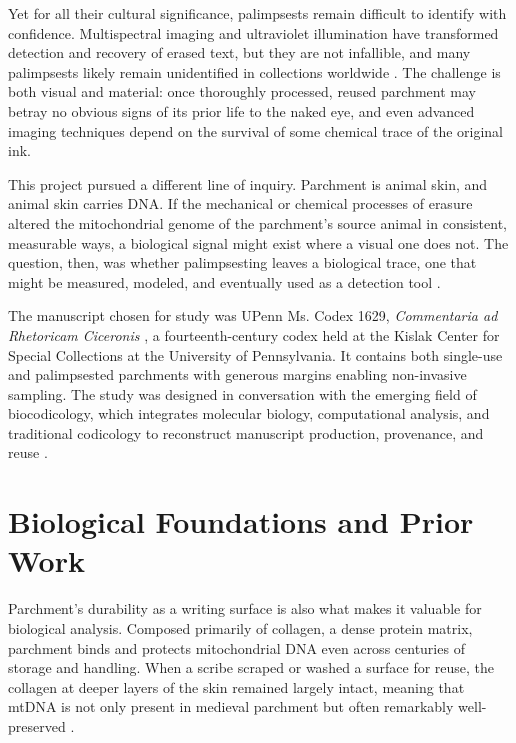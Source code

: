 \documentclass[final]{anthology-ch} %
\begin{document}
Yet for all their cultural significance, palimpsests remain difficult to identify with confidence. Multispectral imaging and ultraviolet illumination have transformed detection and recovery of erased text, but they are not infallible, and many palimpsests likely remain unidentified in collections worldwide \cite{easton2003multispectral}. The challenge is both visual and material: once thoroughly processed, reused parchment may betray no obvious signs of its prior life to the naked eye, and even advanced imaging techniques depend on the survival of some chemical trace of the original ink.

This project pursued a different line of inquiry. Parchment is animal skin, and animal skin carries DNA. If the mechanical or chemical processes of erasure altered the mitochondrial genome of the parchment's source animal in consistent, measurable ways, a biological signal might exist where a visual one does not. The question, then, was whether palimpsesting leaves a biological trace, one that might be measured, modeled, and eventually used as a detection tool \cite{harr2025manuscripts}.

The manuscript chosen for study was UPenn Ms. Codex 1629, \textit{Commentaria ad Rhetoricam Ciceronis} \cite{cicero1342commentaria}, a fourteenth-century codex held at the Kislak Center for Special Collections at the University of Pennsylvania. It contains both single-use and palimpsested parchments with generous margins enabling non-invasive sampling. The study was designed in conversation with the emerging field of biocodicology, which integrates molecular biology, computational analysis, and traditional codicology to reconstruct manuscript production, provenance, and reuse \cite{fiddyment2015animal, teasdale2017york}.

\section{Biological Foundations and Prior Work} \label{sec:prior}

Parchment's durability as a writing surface is also what makes it valuable for biological analysis. Composed primarily of collagen, a dense protein matrix, parchment binds and protects mitochondrial DNA even across centuries of storage and handling. When a scribe scraped or washed a surface for reuse, the collagen at deeper layers of the skin remained largely intact, meaning that mtDNA is not only present in medieval parchment but often remarkably well-preserved \cite{scheible2024development}.
\end{document}
